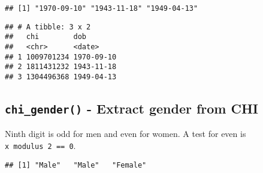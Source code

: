 \documentclass[]{book}
\newenvironment{Shaded}{\begin{snugshade}}{\end{snugshade}}
\newcommand{\CommentTok}[1]{\textcolor[rgb]{0.56,0.35,0.01}{\textit{#1}}}
\newcommand{\ControlFlowTok}[1]{\textcolor[rgb]{0.13,0.29,0.53}{\textbf{#1}}}
\newcommand{\DataTypeTok}[1]{\textcolor[rgb]{0.13,0.29,0.53}{#1}}
\newcommand{\DecValTok}[1]{\textcolor[rgb]{0.00,0.00,0.81}{#1}}
\newcommand{\KeywordTok}[1]{\textcolor[rgb]{0.13,0.29,0.53}{\textbf{#1}}}
\newcommand{\NormalTok}[1]{#1}
\newcommand{\OperatorTok}[1]{\textcolor[rgb]{0.81,0.36,0.00}{\textbf{#1}}}
\newcommand{\StringTok}[1]{\textcolor[rgb]{0.31,0.60,0.02}{#1}}
\theoremstyle{definition}
\theoremstyle{definition}
\theoremstyle{definition}
\theoremstyle{remark}
\begin{document}
\begin{verbatim}
## [1] "1970-09-10" "1943-11-18" "1949-04-13"
\end{verbatim}

\begin{Shaded}
\end{Shaded}

\begin{verbatim}
## # A tibble: 3 x 2
##   chi        dob       
##   <chr>      <date>    
## 1 1009701234 1970-09-10
## 2 1811431232 1943-11-18
## 3 1304496368 1949-04-13
\end{verbatim}

\hypertarget{chi_gender---extract-gender-from-chi}{%
\subsection{\texorpdfstring{\texttt{chi\_gender()} - Extract gender from
CHI}{chi\_gender() - Extract gender from CHI}}\label{chi_gender---extract-gender-from-chi}}

Ninth digit is odd for men and even for women. A test for even is
\texttt{x\ modulus\ 2\ ==\ 0}.

\begin{Shaded}
\end{Shaded}

\begin{verbatim}
## [1] "Male"   "Male"   "Female"
\end{verbatim}
\end{document}
